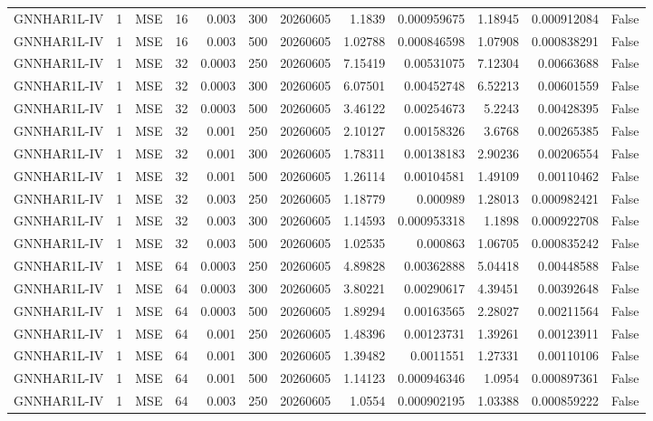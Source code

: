 \begin{tabular}{lrlrrrrrrrrr}
GNNHAR1L-IV & 1 & MSE & 16 & 0.003 & 300 & 20260605 & 1.1839 & 0.000959675 & 1.18945 & 0.000912084 & False \\
GNNHAR1L-IV & 1 & MSE & 16 & 0.003 & 500 & 20260605 & 1.02788 & 0.000846598 & 1.07908 & 0.000838291 & False \\
GNNHAR1L-IV & 1 & MSE & 32 & 0.0003 & 250 & 20260605 & 7.15419 & 0.00531075 & 7.12304 & 0.00663688 & False \\
GNNHAR1L-IV & 1 & MSE & 32 & 0.0003 & 300 & 20260605 & 6.07501 & 0.00452748 & 6.52213 & 0.00601559 & False \\
GNNHAR1L-IV & 1 & MSE & 32 & 0.0003 & 500 & 20260605 & 3.46122 & 0.00254673 & 5.2243 & 0.00428395 & False \\
GNNHAR1L-IV & 1 & MSE & 32 & 0.001 & 250 & 20260605 & 2.10127 & 0.00158326 & 3.6768 & 0.00265385 & False \\
GNNHAR1L-IV & 1 & MSE & 32 & 0.001 & 300 & 20260605 & 1.78311 & 0.00138183 & 2.90236 & 0.00206554 & False \\
GNNHAR1L-IV & 1 & MSE & 32 & 0.001 & 500 & 20260605 & 1.26114 & 0.00104581 & 1.49109 & 0.00110462 & False \\
GNNHAR1L-IV & 1 & MSE & 32 & 0.003 & 250 & 20260605 & 1.18779 & 0.000989 & 1.28013 & 0.000982421 & False \\
GNNHAR1L-IV & 1 & MSE & 32 & 0.003 & 300 & 20260605 & 1.14593 & 0.000953318 & 1.1898 & 0.000922708 & False \\
GNNHAR1L-IV & 1 & MSE & 32 & 0.003 & 500 & 20260605 & 1.02535 & 0.000863 & 1.06705 & 0.000835242 & False \\
GNNHAR1L-IV & 1 & MSE & 64 & 0.0003 & 250 & 20260605 & 4.89828 & 0.00362888 & 5.04418 & 0.00448588 & False \\
GNNHAR1L-IV & 1 & MSE & 64 & 0.0003 & 300 & 20260605 & 3.80221 & 0.00290617 & 4.39451 & 0.00392648 & False \\
GNNHAR1L-IV & 1 & MSE & 64 & 0.0003 & 500 & 20260605 & 1.89294 & 0.00163565 & 2.28027 & 0.00211564 & False \\
GNNHAR1L-IV & 1 & MSE & 64 & 0.001 & 250 & 20260605 & 1.48396 & 0.00123731 & 1.39261 & 0.00123911 & False \\
GNNHAR1L-IV & 1 & MSE & 64 & 0.001 & 300 & 20260605 & 1.39482 & 0.0011551 & 1.27331 & 0.00110106 & False \\
GNNHAR1L-IV & 1 & MSE & 64 & 0.001 & 500 & 20260605 & 1.14123 & 0.000946346 & 1.0954 & 0.000897361 & False \\
GNNHAR1L-IV & 1 & MSE & 64 & 0.003 & 250 & 20260605 & 1.0554 & 0.000902195 & 1.03388 & 0.000859222 & False \\

\end{tabular}
